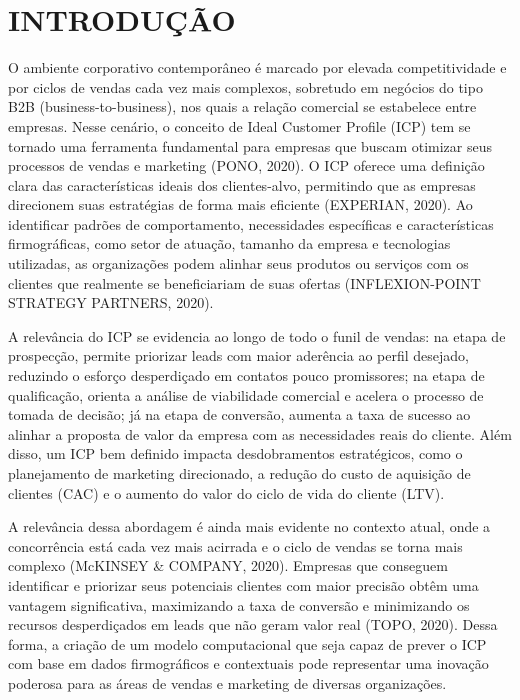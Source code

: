 \chapter{INTRODUÇÃO}

O ambiente corporativo contemporâneo é marcado por elevada competitividade e por ciclos de vendas cada vez mais complexos, sobretudo em negócios do tipo B2B (business-to-business), nos quais a relação comercial se estabelece entre empresas. Nesse cenário, o conceito de Ideal Customer Profile (ICP) tem se tornado uma ferramenta fundamental para empresas que buscam otimizar seus processos de vendas e marketing (PONO, 2020). O ICP oferece uma definição clara das características ideais dos clientes-alvo, permitindo que as empresas direcionem suas estratégias de forma mais eficiente (EXPERIAN, 2020). Ao identificar padrões de comportamento, necessidades específicas e características firmográficas, como setor de atuação, tamanho da empresa e tecnologias utilizadas, as organizações podem alinhar seus produtos ou serviços com os clientes que realmente se beneficiariam de suas ofertas (INFLEXION-POINT STRATEGY PARTNERS, 2020).

A relevância do ICP se evidencia ao longo de todo o funil de vendas: na etapa de prospecção, permite priorizar leads com maior aderência ao perfil desejado, reduzindo o esforço desperdiçado em contatos pouco promissores; na etapa de qualificação, orienta a análise de viabilidade comercial e acelera o processo de tomada de decisão; já na etapa de conversão, aumenta a taxa de sucesso ao alinhar a proposta de valor da empresa com as necessidades reais do cliente. Além disso, um ICP bem definido impacta desdobramentos estratégicos, como o planejamento de marketing direcionado, a redução do custo de aquisição de clientes (CAC) e o aumento do valor do ciclo de vida do cliente (LTV).

A relevância dessa abordagem é ainda mais evidente no contexto atual, onde a concorrência está cada vez mais acirrada e o ciclo de vendas se torna mais complexo (McKINSEY \& COMPANY, 2020). Empresas que conseguem identificar e priorizar seus potenciais clientes com maior precisão obtêm uma vantagem significativa, maximizando a taxa de conversão e minimizando os recursos desperdiçados em leads que não geram valor real (TOPO, 2020). Dessa forma, a criação de um modelo computacional que seja capaz de prever o ICP com base em dados firmográficos e contextuais pode representar uma inovação poderosa para as áreas de vendas e marketing de diversas organizações.

